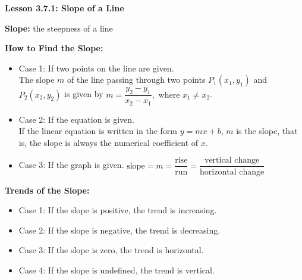   \begin{center}
\textbf{Lesson 3.7.1: Slope of a Line}
\end{center}

\vspace*{-2ex}

\noindent\textbf{Slope:} the steepness of a line

\noindent\textbf{How to Find the Slope:}
\begin{itemize}
   \item Case 1: If two points on the line are given.\\
   The slope $ m $  of the line passing through two points $ P_1(x_1, y_1) $   and $ P_2(x_2, y_2) $  is given by $ m = \dfrac{y_2-y_1}{x_2-x_1}, \text{ where } x_1 \neq x_2 $.
    	 
   \item Case 2: If the equation is given.\\
   If the linear equation is written in the form $ y = mx + b $, $ m $ is the slope, that is, the slope is always the numerical coefficient of $ x$.
   \item Case 3: If the graph is given.   $ \text{slope} = m = \dfrac{\text{rise}}{\text{run}} = \dfrac{\text{vertical change}}{\text{horizontal change}} $  
\end{itemize}


\noindent\textbf{Trends of the Slope:}
\begin{itemize}
   \item Case 1: If the slope is positive, the trend is increasing.
    	 
   \item Case 2: If the slope is negative, the trend is decreasing.
   \item Case 3: If the slope is zero, the trend is horizontal.
   \item Case 4: If the slope is undefined, the trend is vertical.

\end{itemize}
